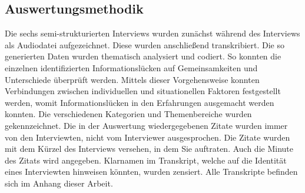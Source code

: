 \subsection{Auswertungsmethodik}
Die sechs semi-strukturierten Interviews wurden zun\"achst während des Interviews als Audiodatei aufgezeichnet. Diese wurden anschließend transkribiert. Die so generierten Daten wurden thematisch analysiert und codiert. So konnten die einzelnen identifizierten Informationslücken auf Gemeinsamkeiten und Unterschiede \"uberpr\"uft werden. Mittels dieser Vorgehensweise konnten Verbindungen zwischen individuellen und situationellen Faktoren festgestellt werden, womit Informationsl\"ucken in den Erfahrungen ausgemacht werden konnten. Die verschiedenen Kategorien und Themenbereiche wurden gekennzeichnet. Die in der Auswertung wiedergegebenen Zitate wurden immer von den Interviewten, nicht vom Interviewer ausgesprochen. Die Zitate wurden mit dem Kürzel des Interviews versehen, in dem Sie auftraten. Auch die Minute des Zitats wird angegeben. Klarnamen im Transkript, welche auf die Identität eines Interviewten hinweisen könnten, wurden zensiert. Alle Transkripte befinden sich im Anhang dieser Arbeit.